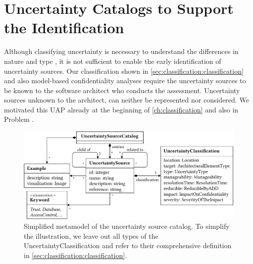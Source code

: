 \section{Uncertainty Catalogs to Support the Identification}%
\label{sec:classification:identification}

Although classifying uncertainty is necessary to understand the differences in nature and type \cite{perez-palacin_uncertainties_2014}, it is not sufficient to enable the early identification of uncertainty sources.
Our classification shown in \autoref{sec:classification:classification} and also model-based confidentiality analyses require the uncertainty sources to be known to the software architect who conducts the assessment.
Uncertainty sources unknown to the architect, can neither be represented nor considered.
We motivated this \acf{UAP} already at the beginning of \autoref{ch:classification} and also in Problem .

\begin{figure}
    \centering
    \includegraphics[width=\linewidth]{figures/chapter5/arc3n-metamodel.pdf}
    \caption[Simplified metamodel of the uncertainty source catalog.]{Simplified metamodel of the uncertainty source catalog. To simplify the illustration, we leave out all types of the UncertaintyClassification and refer to their comprehensive definition in \autoref{sec:classification:classification}.}
    \label{fig:classification:identification:metamodel}
\end{figure}

